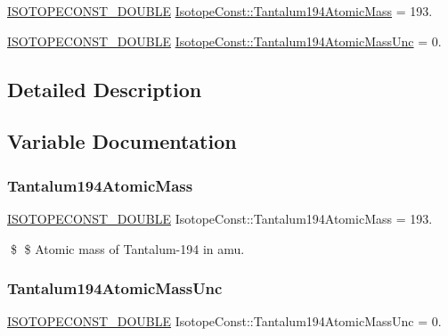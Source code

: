 \begin{DoxyCompactItemize}
\item 
\mbox{\hyperlink{group___isotope_const-_macros_ga8f45a7272ce02c0b4c65c44636ed719a}{I\+S\+O\+T\+O\+P\+E\+C\+O\+N\+S\+T\+\_\+\+D\+O\+U\+B\+LE}} \mbox{\hyperlink{group___isotope_const-_tantalum-_ta194_ga7d9e70cde3cddf780e0474be3b7ace6d}{Isotope\+Const\+::\+Tantalum194\+Atomic\+Mass}} = 193.
\item 
\mbox{\hyperlink{group___isotope_const-_macros_ga8f45a7272ce02c0b4c65c44636ed719a}{I\+S\+O\+T\+O\+P\+E\+C\+O\+N\+S\+T\+\_\+\+D\+O\+U\+B\+LE}} \mbox{\hyperlink{group___isotope_const-_tantalum-_ta194_ga265cbf62e5b7cdfbfc1c35a75da19a0e}{Isotope\+Const\+::\+Tantalum194\+Atomic\+Mass\+Unc}} = 0.
\end{DoxyCompactItemize}


\subsection{Detailed Description}


\subsection{Variable Documentation}
\mbox{\label{group___isotope_const-_tantalum-_ta194_ga7d9e70cde3cddf780e0474be3b7ace6d}} 
\subsubsection{\texorpdfstring{Tantalum194\+Atomic\+Mass}{Tantalum194AtomicMass}}
{\footnotesize\ttfamily \mbox{\hyperlink{group___isotope_const-_macros_ga8f45a7272ce02c0b4c65c44636ed719a}{I\+S\+O\+T\+O\+P\+E\+C\+O\+N\+S\+T\+\_\+\+D\+O\+U\+B\+LE}} Isotope\+Const\+::\+Tantalum194\+Atomic\+Mass = 193.}

\$ \$ Atomic mass of Tantalum-\/194 in amu. \mbox{\label{group___isotope_const-_tantalum-_ta194_ga265cbf62e5b7cdfbfc1c35a75da19a0e}} 
\subsubsection{\texorpdfstring{Tantalum194\+Atomic\+Mass\+Unc}{Tantalum194AtomicMassUnc}}
{\footnotesize\ttfamily \mbox{\hyperlink{group___isotope_const-_macros_ga8f45a7272ce02c0b4c65c44636ed719a}{I\+S\+O\+T\+O\+P\+E\+C\+O\+N\+S\+T\+\_\+\+D\+O\+U\+B\+LE}} Isotope\+Const\+::\+Tantalum194\+Atomic\+Mass\+Unc = 0.}

